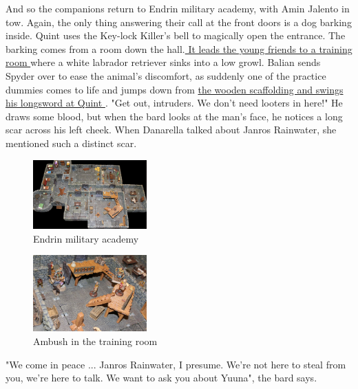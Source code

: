 And so the companions return to Endrin military academy, with Amin Jalento in tow. Again, the only thing answering their call at the front doors is a dog barking inside. Quint uses the Key-lock Killer's bell to magically open the entrance. The barking comes from a room down the hall.\hyperref[fig:Endrin-military-academy-550435227]{ It leads the young friends to a training room } where a white labrador retriever sinks into a low growl. Balian sends Spyder over to ease the animal's discomfort, as suddenly one of the practice dummies comes to life and jumps down from \hyperref[fig:Ambush-in-the-training-room-550436061]{ the wooden scaffolding and swings his longsword at Quint } . "Get out, intruders. We don't need looters in here!" He draws some blood, but when the bard looks at the man's face, he notices a long scar across his left cheek. When Danarella talked about Janros Rainwater, she mentioned such a distinct scar. \\

\begin{figure}[h]
	\centering
	\includegraphics[width=0.39\textwidth]{images/Endrin-military-academy-550435227.jpg}
	\caption{Endrin military academy}
	\label{fig:Endrin-military-academy-550435227}
\end{figure}

\begin{figure}[h]
	\centering
	\includegraphics[width=0.39\textwidth]{images/Ambush-in-the-training-room-550436061.jpg}
	\caption{Ambush in the training room}
	\label{fig:Ambush-in-the-training-room-550436061}
\end{figure}

"We come in peace ... Janros Rainwater, I presume. We're not here to steal from you, we're here to talk. We want to ask you about Yuuna", the bard says.\\

